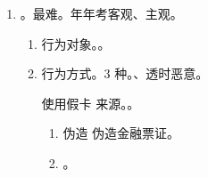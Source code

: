 \begin{enumerate}
\begin{enumerate}
                \begin{enumerate}
                  \item 凭证 = 结算凭证。汇款、托收、存单、信用证等。
                  \item 三票一证 = 汇票、本票、支票、信用证。
                \end{enumerate}
          \item {}。最难。年年考客观、主观。
                \begin{enumerate}
                  \item 行为对象。。
                  \item 行为方式。3 种。、透时恶意。
                        \begin{kk}{使用假卡}
                          来源。。
                          \begin{enumerate}
                            \item 伪造 \yjt 伪造金融票证。
                            \item {}。
                          \end{enumerate}
                        \end{kk}


\end{enumerate}
\end{enumerate}
\end{enumerate}
